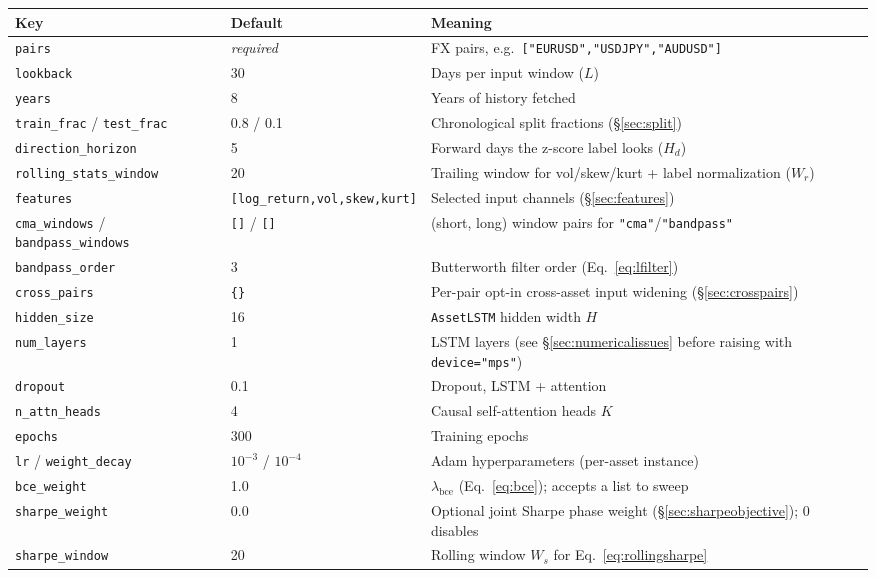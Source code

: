 \documentclass[11pt]{article}
\newcommand{\code}[1]{\texttt{\small #1}}
\begin{document}
\begin{center}
\renewcommand{\arraystretch}{1.2}
\small
\begin{longtable}{@{}p{3.4cm}p{2.0cm}p{9.4cm}@{}}
\toprule
\textbf{Key} & \textbf{Default} & \textbf{Meaning} \\
\midrule
\endhead
\code{pairs} & \emph{required} & FX pairs, e.g.\ \code{["EURUSD","USDJPY","AUDUSD"]} \\
\code{lookback} & 30 & Days per input window ($L$) \\
\code{years} & 8 & Years of history fetched \\
\code{train\_frac} / \code{test\_frac} & 0.8 / 0.1 & Chronological split fractions (\S\ref{sec:split}) \\
\code{direction\_horizon} & 5 & Forward days the z-score label looks ($H_d$) \\
\code{rolling\_stats\_window} & 20 & Trailing window for vol/skew/kurt + label normalization ($W_r$) \\
\code{features} & \code{[log\_return,vol,skew,kurt]} & Selected input channels (\S\ref{sec:features}) \\
\code{cma\_windows} / \code{bandpass\_windows} & \code{[]} / \code{[]} & (short, long) window pairs for \code{"cma"}/\code{"bandpass"} \\
\code{bandpass\_order} & 3 & Butterworth filter order (Eq.~\ref{eq:lfilter}) \\
\code{cross\_pairs} & \code{\{\}} & Per-pair opt-in cross-asset input widening (\S\ref{sec:crosspairs}) \\
\code{hidden\_size} & 16 & \texttt{AssetLSTM} hidden width $H$ \\
\code{num\_layers} & 1 & LSTM layers (see \S\ref{sec:numericalissues} before raising with \code{device="mps"}) \\
\code{dropout} & 0.1 & Dropout, LSTM + attention \\
\code{n\_attn\_heads} & 4 & Causal self-attention heads $K$ \\
\code{epochs} & 300 & Training epochs \\
\code{lr} / \code{weight\_decay} & $10^{-3}$ / $10^{-4}$ & Adam hyperparameters (per-asset instance) \\
\code{bce\_weight} & 1.0 & $\lambda_{\text{bce}}$ (Eq.~\ref{eq:bce}); accepts a list to sweep \\
\code{sharpe\_weight} & 0.0 & Optional joint Sharpe phase weight (\S\ref{sec:sharpeobjective}); 0 disables \\
\code{sharpe\_window} & 20 & Rolling window $W_s$ for Eq.~\ref{eq:rollingsharpe} \\

\end{longtable}
\end{center}
\end{document}
